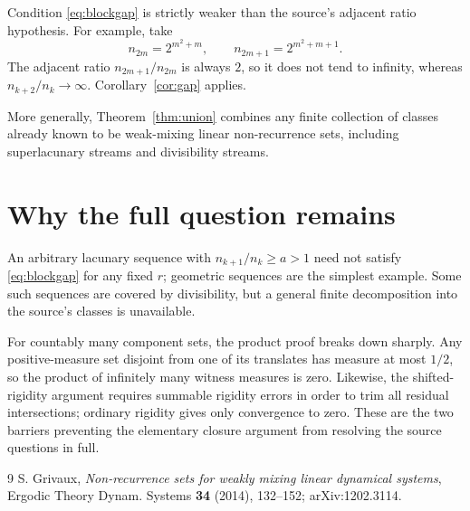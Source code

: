 \documentclass[11pt]{article}
\begin{document}
Condition \eqref{eq:blockgap} is strictly weaker than the source's adjacent
ratio hypothesis.  For example, take
\[
 n_{2m}=2^{m^2+m},\qquad n_{2m+1}=2^{m^2+m+1}.
\]
The adjacent ratio $n_{2m+1}/n_{2m}$ is always $2$, so it does not tend to
infinity, whereas $n_{k+2}/n_k\to\infty$.  Corollary~\ref{cor:gap} applies.

More generally, Theorem~\ref{thm:union} combines any finite collection of
classes already known to be weak-mixing linear non-recurrence sets, including
superlacunary streams and divisibility streams.

\section{Why the full question remains}

An arbitrary lacunary sequence with $n_{k+1}/n_k\ge a>1$ need not satisfy
\eqref{eq:blockgap} for any fixed $r$; geometric sequences are the simplest
example.  Some such sequences are covered by divisibility, but a general
finite decomposition into the source's classes is unavailable.

For countably many component sets, the product proof breaks down sharply.
Any positive-measure set disjoint from one of its translates has measure at
most $1/2$, so the product of infinitely many witness measures is zero.
Likewise, the shifted-rigidity argument requires summable rigidity errors in
order to trim all residual intersections; ordinary rigidity gives only
convergence to zero.  These are the two barriers preventing the elementary
closure argument from resolving the source questions in full.

\begin{thebibliography}{9}
S. Grivaux,
\emph{Non-recurrence sets for weakly mixing linear dynamical systems},
Ergodic Theory Dynam. Systems \textbf{34} (2014), 132--152;
arXiv:1202.3114.
\end{thebibliography}
\end{document}
